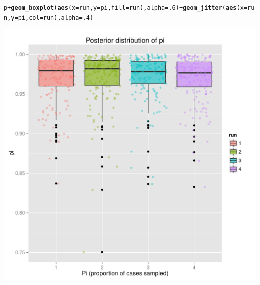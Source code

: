 \documentclass{article}\usepackage[]{graphicx}\usepackage[]{color}
\makeatletter
\newcommand{\hlnum}[1]{\textcolor[rgb]{0.686,0.059,0.569}{#1}}%
\newcommand{\hlopt}[1]{\textcolor[rgb]{0,0,0}{#1}}%
\newcommand{\hlstd}[1]{\textcolor[rgb]{0.345,0.345,0.345}{#1}}%
\newcommand{\hlkwc}[1]{\textcolor[rgb]{0.333,0.667,0.333}{#1}}%
\newcommand{\hlkwd}[1]{\textcolor[rgb]{0.737,0.353,0.396}{\textbf{#1}}}%
\newenvironment{kframe}{%
 \def\at@end@of@kframe{}%
 \ifinner\ifhmode%
  \def\at@end@of@kframe{\end{minipage}}%
  \begin{minipage}{\columnwidth}%
 \fi\fi%
 \def\FrameCommand##1{\hskip\@totalleftmargin \hskip-\fboxsep
 \colorbox{shadecolor}{##1}\hskip-\fboxsep
     \hskip-\linewidth \hskip-\@totalleftmargin \hskip\columnwidth}%
 \MakeFramed {\advance\hsize-\width
   \@totalleftmargin\z@ \linewidth\hsize
   \@setminipage}}%
 {\par\unskip\endMakeFramed%
 \at@end@of@kframe}
\newenvironment{knitrout}{}{} %
\makeatother
\begin{document}
\begin{knitrout}
\color{fgcolor}\begin{kframe}
\begin{alltt}
\hlstd{p} \hlopt{+} \hlkwd{geom_boxplot}\hlstd{(}\hlkwd{aes}\hlstd{(}\hlkwc{x}\hlstd{=run,} \hlkwc{y}\hlstd{=pi,} \hlkwc{fill}\hlstd{=run),}\hlkwc{alpha}\hlstd{=}\hlnum{.6}\hlstd{)} \hlopt{+} \hlkwd{geom_jitter}\hlstd{(}\hlkwd{aes}\hlstd{(}\hlkwc{x}\hlstd{=run,} \hlkwc{y}\hlstd{=pi,} \hlkwc{col}\hlstd{=run),}\hlkwc{alpha}\hlstd{=}\hlnum{.4}\hlstd{)}
\end{alltt}
\end{kframe}

{\centering \includegraphics[width=.6\textwidth]{figs/unnamed-chunk-35} 

}



\end{knitrout}
\end{document}
